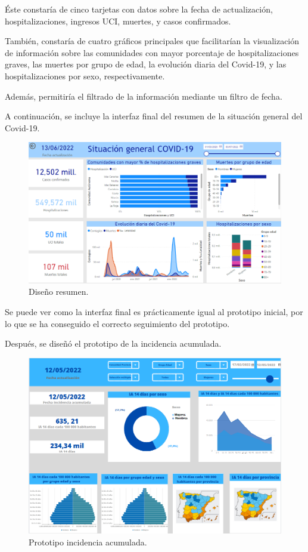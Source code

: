 Éste constaría de cinco tarjetas con datos sobre la fecha de actualización, hospitalizaciones, ingresos UCI, muertes, y casos confirmados. 

También, constaría de cuatro gráficos principales que facilitarían la visualización de información sobre las comunidades con mayor porcentaje de hospitalizaciones graves, las muertes por grupo de edad, la evolución diaria del Covid-19, y las hospitalizaciones por sexo, respectivamente.

Además, permitiría el filtrado de la información mediante un filtro de fecha.

\newpage
A continuación, se incluye la interfaz final del resumen de la situación general del Covid-19.

\begin{figure}[h]
    \advance\leftskip-0.5cm 
    \includegraphics[scale=0.55]{img/powerBI_resumen.PNG}
    \caption{Diseño resumen.}
\end{figure}

Se puede ver como la interfaz final es prácticamente igual al prototipo inicial, por lo que se ha conseguido el correcto seguimiento del prototipo.

\newpage
Después, se diseñó el prototipo de la incidencia acumulada. 

\begin{figure}[h]
    \advance\leftskip-1cm 
    \includegraphics[scale=0.7]{img/prototipo_IA.png}
    \caption{Prototipo incidencia acumulada.}
\end{figure}

